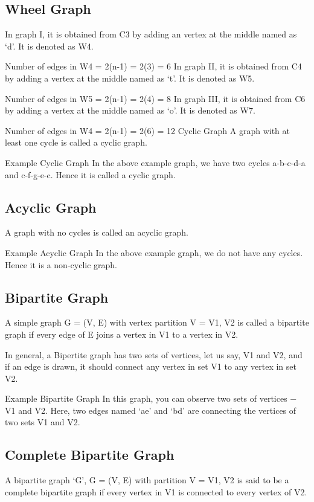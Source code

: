 \subsection{Wheel Graph}
In graph I, it is obtained from C3 by adding an vertex at the middle named as ‘d’. It is denoted as W4.

Number of edges in W4 = 2(n-1) = 2(3) = 6
In graph II, it is obtained from C4 by adding a vertex at the middle named as ‘t’. It is denoted as W5.

Number of edges in W5 = 2(n-1) = 2(4) = 8
In graph III, it is obtained from C6 by adding a vertex at the middle named as ‘o’. It is denoted as W7.

Number of edges in W4 = 2(n-1) = 2(6) = 12
Cyclic Graph
A graph with at least one cycle is called a cyclic graph.

Example
Cyclic Graph
In the above example graph, we have two cycles a-b-c-d-a and c-f-g-e-c. Hence it is called a cyclic graph.

\subsection{Acyclic Graph}
A graph with no cycles is called an acyclic graph.

Example
Acyclic Graph
In the above example graph, we do not have any cycles. Hence it is a non-cyclic graph.

\subsection{Bipartite Graph}
A simple graph G = (V, E) with vertex partition V = {V1, V2} is called a bipartite graph if every edge of E joins a vertex in V1 to a vertex in V2.

In general, a Bipertite graph has two sets of vertices, let us say, V1 and V2, and if an edge is drawn, it should connect any vertex in set V1 to any vertex in set V2.

Example
Bipartite Graph
In this graph, you can observe two sets of vertices − V1 and V2. Here, two edges named ‘ae’ and ‘bd’ are connecting the vertices of two sets V1 and V2.

\subsection{Complete Bipartite Graph}
A bipartite graph ‘G’, G = (V, E) with partition V = {V1, V2} is said to be a complete bipartite graph if every vertex in V1 is connected to every vertex of V2.

